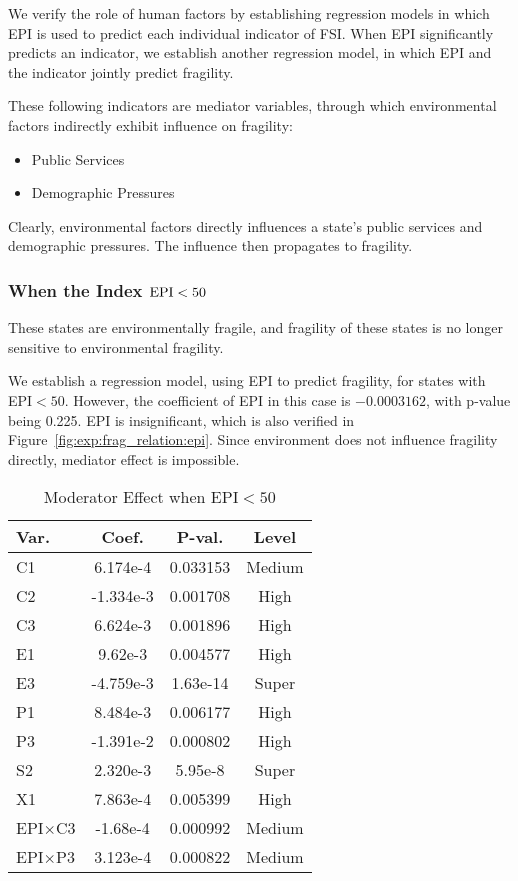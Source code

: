 We verify the role of human factors by establishing regression models in which EPI is used to predict each individual indicator of FSI. When EPI significantly predicts an indicator, we establish another regression model, in which EPI and the indicator jointly predict fragility. 

These following indicators are mediator variables, through which environmental factors indirectly exhibit influence on fragility:
\begin{itemize}
   \item Public Services
   \item Demographic Pressures
\end{itemize}
Clearly, environmental factors directly influences a state's public services and demographic pressures. The influence then propagates to fragility.

\subsubsection{When the Index $\rm{EPI} < 50$}
These states are environmentally fragile, and fragility of these states is no longer sensitive to environmental fragility.

We establish a regression model, using EPI to predict fragility, for states with EPI$<50$. 
However, the coefficient of EPI in this case is $ -0.0003162 $, with p-value being 0.225. EPI is insignificant, which is also verified in Figure~\ref{fig:exp:frag_relation:epi}. Since environment does not influence fragility directly, mediator effect is impossible.

\begin{table}[htbp]
\centering        
   \begin{tabular}{|l|ccc|}\hline
    Var. & Coef. & P-val. & Level \\ \hline
      C1 & 6.174e-4 & 0.033153 & Medium \\ \hline
      C2 & -1.334e-3 & 0.001708 & High \\ \hline
      C3 & 6.624e-3 & 0.001896 & High \\ \hline
      E1 & 9.62e-3 & 0.004577 & High \\ \hline
      E3 & -4.759e-3 & 1.63e-14 & Super \\ \hline
      P1 & 8.484e-3 & 0.006177 & High \\ \hline
      P3 & -1.391e-2 & 0.000802 & High \\ \hline
      S2 & 2.320e-3 & 5.95e-8 & Super \\ \hline
      X1 & 7.863e-4 & 0.005399 & High \\ \hline
      EPI$\times$C3 & -1.68e-4 & 0.000992 & Medium \\ \hline
      EPI$\times$P3 & 3.123e-4 & 0.000822 & Medium \\ \hline
   \end{tabular}
   \caption{Moderator Effect when EPI$<50$}
   \label{tab:exp:indirect:moderator:case2}
\end{table}

